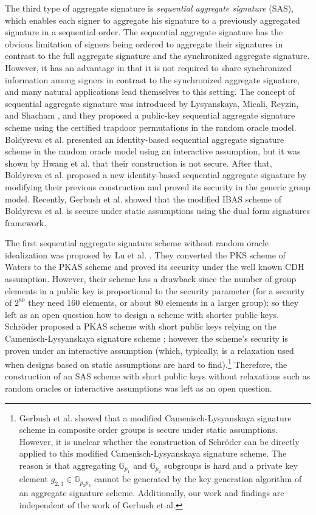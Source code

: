 \documentclass[11pt,letterpaper]{article}
\newcommand{\G}{\mathbb{G}}
\begin{document}
The third type of aggregate signature is \textit{sequential aggregate
signature} (SAS), which enables each signer to aggregate his signature to a
previously aggregated signature in a sequential order. The sequential
aggregate signature has the obvious limitation of signers being ordered to
aggregate their signatures in contrast to the full aggregate signature and
the synchronized aggregate signature. However, it has an advantage in that it
is not required to share synchronized information among signers in contrast
to the synchronized aggregate signature, and many natural applications lead
themselves to this setting. The concept of sequential aggregate signature was
introduced by Lysyanskaya, Micali, Reyzin, and Shacham
\cite{LysyanskayaMRS04}, and they proposed a public-key sequential aggregate
signature scheme using the certified trapdoor permutations in the random
oracle model. Boldyreva et al. \cite{BoldyrevaGOY07} presented an
identity-based sequential aggregate signature scheme in the random oracle
model using an interactive assumption, but it was shown by Hwang et al.
\cite{HwangLY09} that their construction is not secure. After that, Boldyreva
et al. \cite{BoldyrevaGOY10} proposed a new identity-based sequential
aggregate signature by modifying their previous construction and proved its
security in the generic group model. Recently, Gerbush et al.
\cite{GerbushLOW12} showed that the modified IBAS scheme of Boldyreva et al.
\cite{BoldyrevaGOY10} is secure under static assumptions using the dual form
signatures framework.

The first sequential aggregate signature scheme without random oracle
idealization was proposed by Lu et al. \cite{LuOSSW06,LuOSSW13}. They
converted the PKS scheme of Waters \cite{Waters05} to the PKAS scheme and
proved its security under the well known CDH assumption. However, their
scheme has a drawback since the number of group elements in a public key is
proportional to the security parameter (for a security of $2^{80}$ they need
$160$ elements, or about $80$ elements in a larger group); so they left as an
open question how to design a scheme with shorter public keys. Schr{\"o}der
proposed a PKAS scheme with short public keys relying on the
Camenisch-Lysyanskaya signature scheme \cite{Schroder11}; however the
scheme's security is proven under an interactive assumption (which,
typically, is a relaxation used when designs based on static assumptions are
hard to find).\footnote{Gerbush et al. \cite{GerbushLOW12} showed that a
modified Camenisch-Lysyanskaya signature scheme in composite order groups is
secure under static assumptions. However, it is unclear whether the
construction of Schr{\"o}der can be directly applied to this modified
Camenisch-Lysyanskaya signature scheme. The reason is that aggregating
$\G_{p_1}$ and $\G_{p_2}$ subgroups is hard and a private key element
$g_{2,3} \in \G_{p_2 p_3}$ cannot be generated by the key generation
algorithm of an aggregate signature scheme. Additionally, our work and
findings are independent of the work of Gerbush et al.} Therefore, the
construction of an SAS scheme with short public keys without relaxations such
as random oracles or interactive assumptions was left as an open question.
\end{document}
